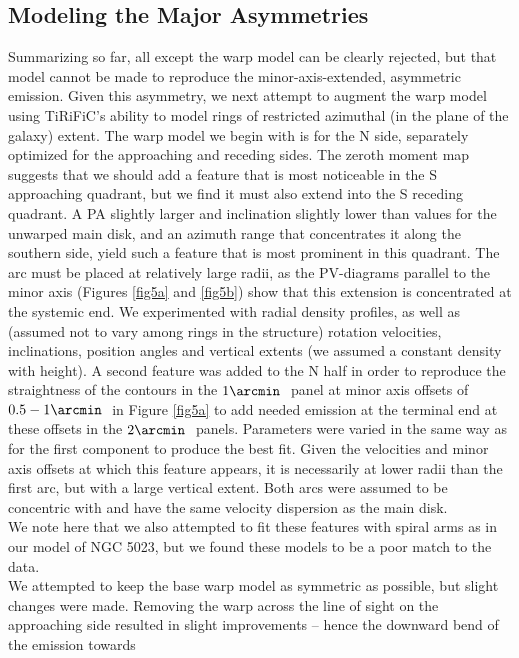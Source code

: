 \documentclass[useAMS,usenatbib]{mn2e}
\newcommand\tiri{{\sc TiRiFiC}}
\begin{document}
\subsection{Modeling the Major Asymmetries} \label{U2082asym}
Summarizing so far, all except the warp model can be clearly rejected,
but that model cannot be made to reproduce the minor-axis-extended,
asymmetric emission.  Given this asymmetry, we next attempt to augment
the warp model using \tiri's ability to model rings of restricted
azimuthal (in the plane of the galaxy) extent.  The warp model we
begin with is for the N side, separately optimized for the approaching
and receding sides.  The zeroth moment map suggests that we should add
a feature that is most noticeable in the S approaching quadrant, but
we find it must also extend into the S receding quadrant.  A PA
slightly larger and inclination slightly lower than values for the
unwarped main disk, and an azimuth range that concentrates it along
the southern side, yield such a feature that is most prominent in this
quadrant.  The arc must be placed at relatively large radii, as
the PV-diagrams parallel to the minor axis (Figures \ref{fig5a} and
\ref{fig5b}) show that this extension is concentrated at the systemic
end.  We experimented with radial density profiles, as well as
(assumed not to vary among rings in the structure) rotation
velocities, inclinations, position angles and vertical extents (we
assumed a constant density with height).  A second feature was added
to the N half in order to reproduce the straightness of the contours
in the $1\arcmin\ $ panel at minor axis offsets of $0.5-1\arcmin\ $ in
Figure \ref{fig5a} to add needed emission at the terminal end at these
offsets in the $2\arcmin\ $ panels.  Parameters were varied in the
same way as for the first component to produce the best fit.  Given
the velocities and minor axis offsets at which this feature appears,
it is necessarily at lower radii than the first arc, but with a large
vertical extent.  Both arcs were assumed to be concentric with and 
have the same velocity dispersion as the main disk.\\ \indent We note
here that we also attempted to fit these features with spiral arms as
in our model of NGC 5023, but we found these models to be a poor match
to the data.\\ \indent We attempted to keep the base warp model as
symmetric as possible, but slight changes were made.  Removing the
warp across the line of sight on the approaching side resulted in
slight improvements -- hence the downward bend of the emission towards
\end{document}
